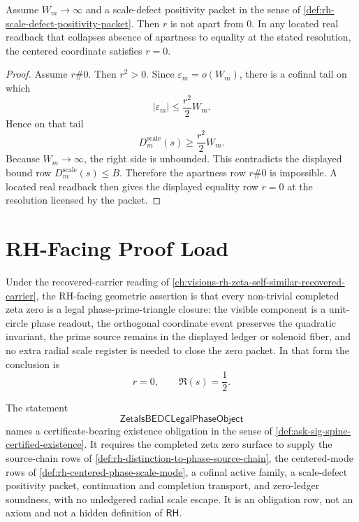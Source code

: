 \begin{theorem}
\label{thm:rh-positive-scale-defect-criterion}
Assume $W_m\to\infty$ and a scale-defect positivity packet in the sense of
\autoref{def:rh-scale-defect-positivity-packet}. Then $r$ is not apart
from $0$. In any located real readback that collapses absence of
apartness to equality at the stated resolution, the centered coordinate
satisfies $r=0$.
\end{theorem}

\begin{proof}
Assume $r\#0$. Then $r^2>0$. Since
$\varepsilon_m=o(W_m)$, there is a cofinal tail on which
$$
|\varepsilon_m|\le\frac{r^2}{2}W_m.
$$
Hence on that tail
$$
D_m^{\mathrm{scale}}(s)
\ge
\frac{r^2}{2}W_m.
$$
Because $W_m\to\infty$, the right side is unbounded. This contradicts the
displayed bound row $D_m^{\mathrm{scale}}(s)\le B$. Therefore the
apartness row $r\#0$ is impossible. A located real readback then gives the
displayed equality row $r=0$ at the resolution licensed by the packet.
\end{proof}

\section{RH-Facing Proof Load}
\label{sec:rh-phase-triangle-proof-load}

\begin{principle}
\label{prin:rh-phase-prime-triangle-closure}
Under the recovered-carrier reading of
\autoref{ch:visions-rh-zeta-self-similar-recovered-carrier}, the
RH-facing geometric assertion is that every non-trivial completed zeta
zero is a legal phase-prime-triangle closure: the visible component is a
unit-circle phase readout, the orthogonal coordinate event preserves the
quadratic invariant, the prime source remains in the displayed ledger or
solenoid fiber, and no extra radial scale register is needed to close the
zero packet. In that form the conclusion is
$$
r=0,
\qquad
\Re(s)=\frac12.
$$
\end{principle}

\begin{definition}
\label{def:rh-bedc-legal-zeta-phase-object}
The statement
$$
\mathsf{ZetaIsBEDCLegalPhaseObject}
$$
names a certificate-bearing existence obligation in the sense of
\autoref{def:ask-sig-spine-certified-existence}. It requires the completed
zeta zero surface to supply the source-chain rows of
\autoref{def:rh-distinction-to-phase-source-chain}, the centered-mode
rows of \autoref{def:rh-centered-phase-scale-mode}, a cofinal active
family, a scale-defect positivity packet, continuation and completion
transport, and zero-ledger soundness, with no unledgered radial scale
escape. It is an obligation row, not an axiom and not a hidden definition
of $\mathsf{RH}$.
\end{definition}

